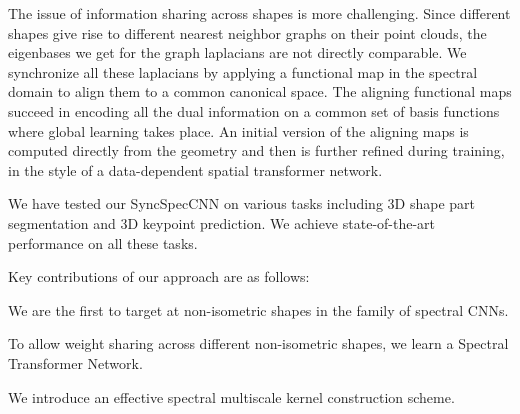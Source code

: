 The issue of information sharing across shapes is more challenging.  Since different shapes give rise to different nearest neighbor graphs on their point clouds, the eigenbases we get for the graph laplacians are not directly comparable. We synchronize all these laplacians by applying a functional map in the spectral domain to align them to a common canonical space. %
The aligning functional maps succeed in encoding all the dual information on a common set of basis functions where global learning takes place. An initial version of the aligning maps is computed directly from the geometry and then is further refined during training, in the style of a data-dependent spatial transformer network. %


We have tested our SyncSpecCNN on various tasks including 3D shape part segmentation and 3D keypoint prediction. We achieve state-of-the-art performance on all these tasks.

Key contributions of our approach are as follows:%
\bitem
    \item We are the first to target at non-isometric shapes in the family of spectral CNNs.%
    \item To allow weight sharing across different non-isometric shapes, we learn a Spectral Transformer Network.
    \item We introduce an effective spectral multiscale kernel construction scheme. %
\eitem



